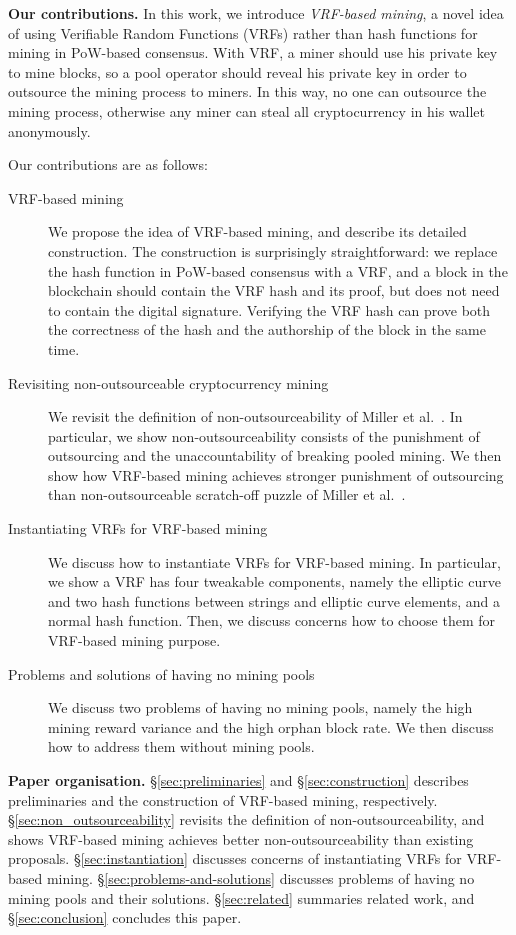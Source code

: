 \textbf{Our contributions.}
In this work, we introduce \textit{VRF-based mining}, a novel idea of using Verifiable Random Functions (VRFs) rather than hash functions for mining in PoW-based consensus.
With VRF, a miner should use his private key to mine blocks, so a pool operator should reveal his private key in order to outsource the mining process to miners.
In this way, no one can outsource the mining process, otherwise any miner can steal all cryptocurrency in his wallet anonymously.

Our contributions are as follows:

\begin{description}
    \item [VRF-based mining] We propose the idea of VRF-based mining, and describe its detailed construction. The construction is surprisingly straightforward: we replace the hash function in PoW-based consensus with a VRF, and a block in the blockchain should contain the VRF hash and its proof, but does not need to contain the digital signature. Verifying the VRF hash can prove both the correctness of the hash and the authorship of the block in the same time.
    \item [Revisiting non-outsourceable cryptocurrency mining] We revisit the definition of non-outsourceability of Miller et al.~\cite{miller2015nonoutsourceable}. In particular, we show non-outsourceability consists of the punishment of outsourcing and the unaccountability of breaking pooled mining. We then show how VRF-based mining achieves stronger punishment of outsourcing than non-outsourceable scratch-off puzzle of Miller et al.~\cite{miller2015nonoutsourceable}.
    \item [Instantiating VRFs for VRF-based mining] We discuss how to instantiate VRFs for VRF-based mining. In particular, we show a VRF has four tweakable components, namely the elliptic curve and two hash functions between strings and elliptic curve elements, and a normal hash function. Then, we discuss concerns how to choose them for VRF-based mining purpose.
    \item [Problems and solutions of having no mining pools] We discuss two problems of having no mining pools, namely the high mining reward variance and the high orphan block rate. We then discuss how to address them without mining pools.
\end{description}

\textbf{Paper organisation.}
\S\ref{sec:preliminaries} and \S\ref{sec:construction} describes preliminaries and the construction of VRF-based mining, respectively.
\S\ref{sec:non_outsourceability} revisits the definition of non-outsourceability, and shows VRF-based mining achieves better non-outsourceability than existing proposals.
\S\ref{sec:instantiation} discusses concerns of instantiating VRFs for VRF-based mining.
\S\ref{sec:problems-and-solutions} discusses problems of having no mining pools and their solutions.
\S\ref{sec:related} summaries related work, and \S\ref{sec:conclusion} concludes this paper.
